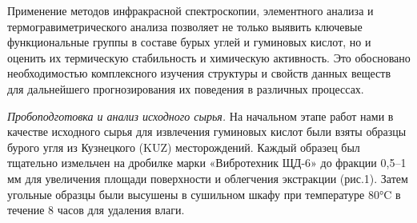 \begin{multicols}{2}
Применение методов инфракрасной спектроскопии, элементного анализа и
термогравиметрического анализа позволяет не только выявить ключевые
функциональные группы в составе бурых углей и гуминовых кислот, но и
оценить их термическую стабильность и химическую активность. Это
обосновано необходимостью комплексного изучения структуры и свойств
данных веществ для дальнейшего прогнозирования их поведения в различных
процессах.

\emph{Пробоподготовка и анализ исходного сырья.} На начальном этапе
работ нами в качестве исходного сырья для извлечения гуминовых кислот
были взяты образцы бурого угля из Кузнецкого (KUZ) месторождений. Каждый
образец был тщательно измельчен на дробилке марки «Вибротехник ЩД-6» до
фракции 0,5--1 мм для увеличения площади поверхности и облегчения
экстракции (рис.1). Затем угольные образцы были высушены в сушильном
шкафу при температуре 80°C в течение 8 часов для удаления влаги.
\end{multicols}


